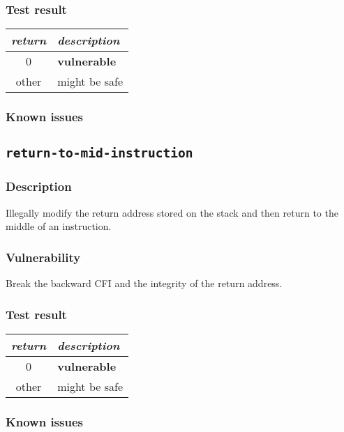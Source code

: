 \documentclass[a4paper]{book}
\begin{document}
\subsubsection{Test result}
\begin{tabular}{cl}
  \toprule
  \emph{return}  & \emph{description} \\
  \midrule
  0              & \textbf{vulnerable} \\
  other          & might be safe \\
  \bottomrule
\end{tabular}
  
\subsubsection{Known issues}

\newpage
\subsection{\texttt{return-to-mid-instruction}}\label{test-return-to-mid-instruction}

\subsubsection{Description}
Illegally modify the return address stored on the stack and then return to the middle of an instruction.

\subsubsection{Vulnerability}
Break the backward CFI and the integrity of the return address.

\subsubsection{Test result}
\begin{tabular}{cl}
  \toprule
  \emph{return}  & \emph{description} \\
  \midrule
  0              & \textbf{vulnerable} \\
  other          & might be safe \\
  \bottomrule
\end{tabular}
  
\subsubsection{Known issues}
\end{document}
